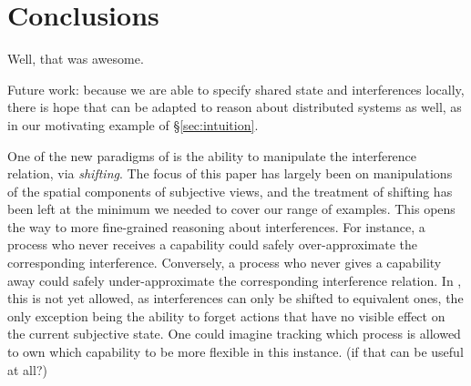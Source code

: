\section{Conclusions}
\label{sec:conclusion}

Well, that was awesome.

Future work: because we are able to specify shared state and
interferences locally, there is hope that \colosl can be adapted to
reason about distributed systems as well, as in our motivating example
of \S\ref{sec:intuition}.


One of the new paradigms of \colosl is the ability to manipulate the
interference relation, via \emph{shifting}. The focus of this paper
has largely been on manipulations of the spatial components of
subjective views, and the treatment of shifting has been left at the
minimum we needed to cover our range of examples. This opens the way
to more fine-grained reasoning about interferences. For instance, a
process who never receives a capability could safely over-approximate
the corresponding interference. Conversely, a process who never gives
a capability away could safely under-approximate the corresponding
interference relation. In \colosl, this is not yet allowed, as
interferences can only be shifted to equivalent ones, the only
exception being the ability to forget actions that have no visible
effect on the current subjective state. One could imagine tracking
which process is allowed to own which capability to be more flexible
in this instance. (if that can be useful at all?)
